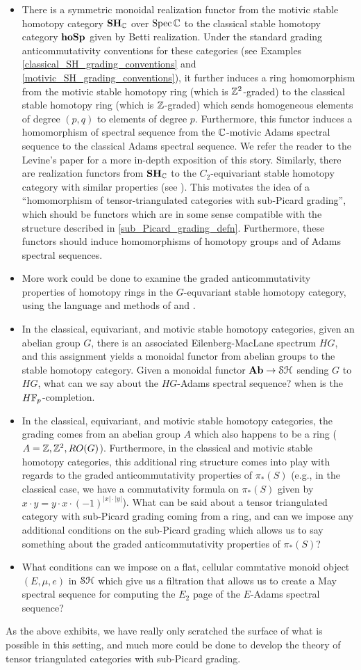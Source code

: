\documentclass[../main.tex]{subfiles}
\begin{document}
\begin{itemize}
    \item There is a symmetric monoidal realization functor from the motivic stable homotopy category $\mathbf{SH}_{\mathbb{C}}$ over $\operatorname{Spec}\mathbb{C}$ to the classical stable homotopy category $\mathbf{hoSp}$ given by Betti realization. Under the standard grading anticommutativity conventions for these categories (see Examples \ref{classical_SH_grading_conventions} and \ref{motivic_SH_grading_conventions}), it further induces a ring homomorphism from the motivic stable homotopy ring (which is $\mathbb{Z}^2$-graded) to the classical stable homotopy ring (which is $\mathbb{Z}$-graded) which sends homogeneous elements of degree $(p,q)$ to elements of degree $p$. Furthermore, this functor induces a homomorphism of spectral sequence from the $\mathbb{C}$-motivic Adams spectral sequence to the classical Adams spectral sequence. We refer the reader to the Levine's paper \cite{Levine_2013} for a more in-depth exposition of this story. Similarly, there are realization functors from $\mathbf{SH}_{\mathbb{C}}$ to the $C_2$-equivariant stable homotopy category with similar properties (see \cite[Remarks 3 \& 4]{DDIO}). This motivates the idea of a ``homomorphism of tensor-triangulated categories with sub-Picard grading'', which should be functors which are in some sense compatible with the structure described in \autoref{sub_Picard_grading_defn}. Furthermore, these functors should induce homomorphisms of homotopy groups and of Adams spectral sequences.
    \item More work could be done to examine the graded anticommutativity properties of homotopy rings in the $G$-equvariant stable homotopy category, using the language and methods of  and \cite{DDIO}.
    \item In the classical, equivariant, and motivic stable homotopy categories, given an abelian group $G$, there is an associated Eilenberg-MacLane spectrum $HG$, and this assignment yields a monoidal functor from abelian groups to the stable homotopy category. Given a monoidal functor $\mathbf{Ab}\to\mathcal{SH}$ sending $G$ to $HG$, what can we say about the $HG$-Adams spectral sequence? when is the $H\mathbb{F}_p$-completion.
    \item In the classical, equivariant, and motivic stable homotopy categories, the grading comes from an abelian group $A$ which also happens to be a ring ($A=\mathbb{Z},\mathbb{Z}^2,RO(G)$). Furthermore, in the classical and motivic stable homotopy categories, this additional ring structure comes into play with regards to the graded anticommutativity properties of $\pi_*(S)$ (e.g., in the classical case, we have a commutativity formula on $\pi_*(S)$ given by $x\cdot y=y\cdot x\cdot(-1)^{|x|\cdot|y|}$). What can be said about a tensor triangulated category with sub-Picard grading coming from a ring, and can we impose any additional conditions on the sub-Picard grading which allows us to say something about the graded anticommutativity properties of $\pi_*(S)$?
    \item What conditions can we impose on a flat, cellular commtative monoid object $(E,\mu,e)$ in $\mathcal{SH}$ which give us a filtration that allows us to create a May spectral sequence for computing the $E_2$ page of the $E$-Adams spectral sequence?
\end{itemize}

As the above exhibits, we have really only scratched the surface of what is possible in this setting, and much more could be done to develop the theory of tensor triangulated categories with sub-Picard grading.
\end{document}
